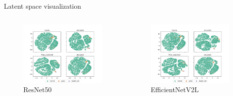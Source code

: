 \documentclass[aspectratio=169]{beamer}
\begin{document}
\begin{frame}{Latent space visualization}
    \begin{columns}
        \begin{column}{0.45\textwidth}
            \begin{figure}
                \centering
                \includegraphics[width=\columnwidth,trim={0 0 0 1cm},clip]{./results/resnet50_vgg19/20230514_213740_feature_vectors_1.png}
                \caption*{ResNet50}
            \end{figure}
        \end{column}
        \begin{column}{0.45\textwidth}
            \begin{figure}
                \centering
                \includegraphics[width=\columnwidth,trim={0 0 0 1cm},clip]{./results/efficientnetv2l_vgg19/20230525_194238_feature_vectors_1.png}
                \caption*{EfficientNetV2L}
            \end{figure}
        \end{column}
    \end{columns}
\end{frame}
\end{document}
